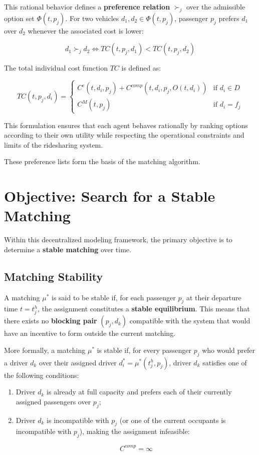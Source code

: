 \documentclass[12pt, a4paper]{article}
\begin{document}
This rational behavior defines a \textbf{preference relation} $\succ_j$ over the admissible option set $\Phi(t,p_j)$. For two vehicles $d_1,d_2\in\Phi(t,p_j)$, passenger $p_j$ prefers $d_1$ over $d_2$ whenever the associated cost is lower:

$$
d_1\succ_j d_2
\iff
TC(t,p_j,d_1)<TC(t,p_j,d_2)
$$

The total individual cost function $TC$ is defined as:

$$
TC(t,p_j,d_i)=
\begin{cases}
C^c(t,d_i,p_j)
+
C^{comp}(t,d_i,p_j,O(t,d_i))
&
\text{if }d_i\in D
\\
C^M(t,p_j)
&
\text{if }d_i=f_j
\end{cases}
$$

This formulation ensures that each agent behaves rationally by ranking options according to their own utility while respecting the operational constraints and limits of the ridesharing system.

These preference lists form the basis of the matching algorithm.


\section{Objective: Search for a Stable Matching}

Within this decentralized modeling framework, the primary objective is to determine a \textbf{stable matching} over time.

\subsection{Matching Stability}

A matching $\mu^*$ is said to be stable if, for each passenger $p_j$ at their departure time $t=t_j^h$, the assignment constitutes a \textbf{stable equilibrium}. This means that there exists no \textbf{blocking pair} $(p_j,d_k)$ compatible with the system that would have an incentive to form outside the current matching.

More formally, a matching $\mu^*$ is stable if, for every passenger $p_j$ who would prefer a driver $d_k$ over their assigned driver $d_i^*=\mu^*(t_j^h,p_j)$, driver $d_k$ satisfies one of the following conditions:

\begin{enumerate}

    \item Driver $d_k$ is already at full capacity and prefers each of their currently assigned passengers over $p_j$;

    \item Driver $d_k$ is incompatible with $p_j$ (or one of the current occupants is incompatible with $p_j$), making the assignment infeasible:

$$
C^{comp}=\infty
$$

\end{enumerate}
\end{document}
